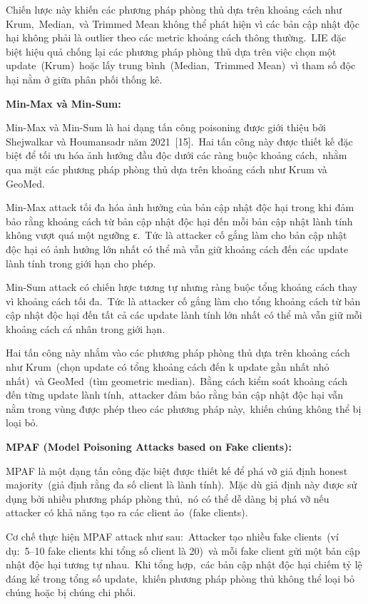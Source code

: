 Chiến lược này khiến các phương pháp phòng thủ dựa trên khoảng cách như Krum,~Median,~và Trimmed Mean không thể phát hiện vì các bản cập nhật độc hại không phải là outlier theo các metric khoảng cách thông thường.~LIE đặc biệt hiệu quả chống lại các phương pháp phòng thủ dựa trên việc chọn một update~(Krum)~hoặc lấy trung bình~(Median,~Trimmed Mean)~vì tham số độc hại nằm ở giữa phân phối thống kê.

\textbf{Min-Max và Min-Sum:}

Min-Max và Min-Sum là hai dạng tấn công poisoning được giới thiệu bởi Shejwalkar và Houmansadr năm 2021~{[}15{]}.~Hai tấn công này được thiết kế đặc biệt để tối ưu hóa ảnh hưởng đầu độc dưới các ràng buộc khoảng cách,~nhằm qua mặt các phương pháp phòng thủ dựa trên khoảng cách như Krum và GeoMed.

Min-Max attack tối đa hóa ảnh hưởng của bản cập nhật độc hại trong khi đảm bảo rằng khoảng cách từ bản cập nhật độc hại đến mỗi bản cập nhật lành tính không vượt quá một ngưỡng ε.~Tức là attacker cố gắng làm cho bản cập nhật độc hại có ảnh hưởng lớn nhất có thể mà vẫn giữ khoảng cách đến các update lành tính trong giới hạn cho phép.

Min-Sum attack có chiến lược tương tự nhưng ràng buộc tổng khoảng cách thay vì khoảng cách tối đa.~Tức là attacker cố gắng làm cho tổng khoảng cách từ bản cập nhật độc hại đến tất cả các update lành tính lớn nhất có thể mà vẫn giữ mỗi khoảng cách cá nhân trong giới hạn.

Hai tấn công này nhắm vào các phương pháp phòng thủ dựa trên khoảng cách như Krum~(chọn update có tổng khoảng cách đến k update gần nhất nhỏ nhất)~và GeoMed~(tìm geometric median).~Bằng cách kiểm soát khoảng cách đến từng update lành tính,~attacker đảm bảo rằng bản cập nhật độc hại vẫn nằm trong vùng được phép theo các phương pháp này,~khiến chúng không thể bị loại bỏ.

\textbf{MPAF (Model Poisoning Attacks based on Fake clients):}

MPAF là một dạng tấn công đặc biệt được thiết kế để phá vỡ giả định honest majority~(giả định rằng đa số client là lành tính).~Mặc dù giả định này được sử dụng bởi nhiều phương pháp phòng thủ,~nó có thể dễ dàng bị phá vỡ nếu attacker có khả năng tạo ra các client ảo~(fake clients).

Cơ chế thực hiện MPAF attack như sau:~Attacker tạo nhiều fake clients~(ví dụ:~5--10 fake clients khi tổng số client là 20)~và mỗi fake client gửi một bản cập nhật độc hại tương tự nhau.~Khi tổng hợp,~các bản cập nhật độc hại chiếm tỷ lệ đáng kể trong tổng số update,~khiến phương pháp phòng thủ không thể loại bỏ chúng hoặc bị chúng chi phối.

